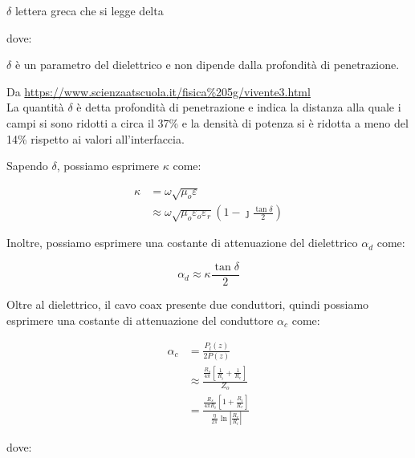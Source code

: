 \begin{tcolorbox}
    $\delta$ lettera greca che si legge delta
\end{tcolorbox}

dove: 

$\delta$ è un parametro del dielettrico e non dipende dalla profondità di penetrazione. 

\begin{tcolorbox}
    Da \url{https://www.scienzaatscuola.it/fisica%205g/vivente3.html} \\ 
    La quantità $\delta$ è detta profondità di penetrazione e indica la distanza alla quale i campi si sono ridotti a circa il 37\% e la densità di potenza si è ridotta a meno del 14\% rispetto ai valori all'interfaccia. 
\end{tcolorbox}

Sapendo $\delta$, possiamo esprimere $\kappa$ come: 

{\Large \begin{equation}
    \begin{split}
        \kappa 
        &= \omega \sqrt{\mu_o \varepsilon} \\ 
        &\approx \omega \sqrt{\mu_o \varepsilon_o \varepsilon_r } (1 - \jmath \frac{\tan \delta}{2})    
    \end{split}
\end{equation}}

Inoltre, possiamo esprimere una costante di attenuazione del dielettrico $\alpha_d$ come: 

{\Large \begin{equation}
    \alpha_d \approx \kappa \frac{\tan \delta}{2}
\end{equation}}

Oltre al dielettrico, il cavo coax presente due conduttori, quindi possiamo 
esprimere una costante di attenuazione del conduttore $\alpha_c$ come: 

{\Large \begin{equation}
    \begin{split}
        \alpha_c 
        &= \frac{P_l (z)}{2P(z)} \\ 
        &\approx \frac{\frac{R_s}{4 \pi} [\frac{1}{R_i} + \frac{1}{R_e}]}{Z_o} \\ 
        &= \frac{\frac{R_s}{4 \pi R_i} [1 + \frac{R_i}{R_e}]}{\frac{\eta}{2 \pi} \ln \left|\frac{R_e}{R_i}\right|}
    \end{split}
\end{equation}} 

dove: 

